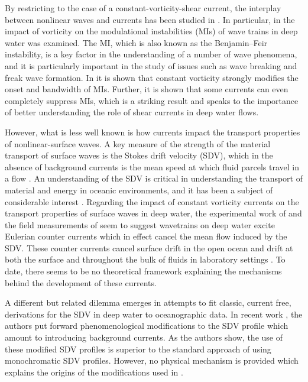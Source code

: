 \documentclass{JFM_Style/jfm}
\begin{document}
By restricting to the case of a constant-vorticity-shear current, the interplay between nonlinear waves and currents has been studied in \cite{brevik,simmen,baumstein,choi,thomas2012nonlinear}. In particular, in \cite{thomas2012nonlinear} the impact of vorticity on the modulational instabilities (MIs) of wave trains in deep water was examined.  The MI, which is also known as the Benjamin--Feir instability, is a key factor in the understanding of a number of wave phenomena, and it is particularly important in the study of issues such as wave breaking and freak wave formation.  In \cite{thomas2012nonlinear} it is shown that constant vorticity strongly modifies the onset and bandwidth of MIs. Further, it is shown that some currents can even completely suppress MIs, which is a striking result and speaks to the importance of better understanding the role of shear currents in deep water flows.  

However, what is less well known is how currents impact the transport properties of nonlinear-surface waves.  A key measure of the strength of the material transport of surface waves is the Stokes drift velocity (SDV), which in the absence of background currents is the mean speed at which fluid parcels travel in a flow \cite{longuet}.  An understanding of the SDV is critical in understanding the transport of material and energy in oceanic environments, and it has been a subject of considerable interest \cite{breivik,mcwilliams,webb}.  Regarding the impact of constant vorticity currents on the transport properties of surface waves in deep water, the experimental work of \cite{monismith} and the field measurements of \cite{smith} seem to suggest wavetrains on deep water excite Eulerian counter currents which in effect cancel the mean flow induced by the SDV.  These counter currents cancel surface drift in the open ocean \cite{smith} and drift at both the surface and throughout the bulk of fluids in laboratory settings \cite{monismith}.  To date, there seems to be no theoretical framework explaining the mechanisms behind the development of these currents.  

A different but related dilemma emerges in attempts to fit classic, current free, derivations for the SDV in deep water to oceanographic data.  In recent work \cite{breivik}, the authors put forward phenomenological modifications to the SDV profile which amount to introducing background currents. As the authors show, the use of these modified SDV profiles is superior to the standard approach of using monochromatic SDV profiles.  However, no physical mechanism is provided which explains the origins of the modifications used in \cite{breivik}.
\end{document}
